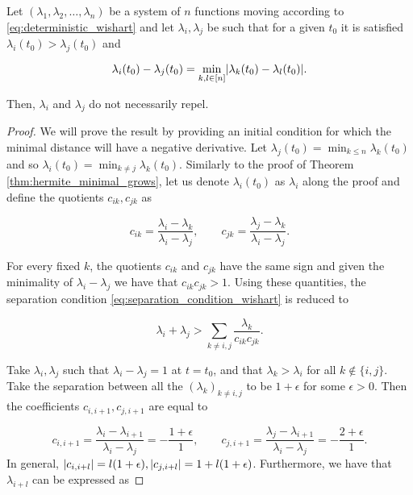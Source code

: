\begin{proposition} \label{proposition:laguerre_does_not_grow}
    Let $(\lambda_1, \lambda_2, \dots, \lambda_n)$ be a system of $n$ functions moving according to \eqref{eq:deterministic_wishart} and let $\lambda_i,\lambda_j$ be such that for a given $t_0$ it is satisfied $\lambda_i(t_0) > \lambda_j(t_0)$ and 
    
    \begin{equation*}
        \lambda_i(t_0) - \lambda_j(t_0) = \min_{k,l \in [n]} \lvert  \lambda_k(t_0) - \lambda_l(t_0) \rvert.
    \end{equation*}

    Then, $\lambda_i$ and $\lambda_j$ do not necessarily repel. 
\end{proposition}

\begin{proof}
    We will prove the result by providing an initial condition for which the minimal distance will have a negative derivative. Let $\lambda_j(t_0) = \min_{k \le n} \lambda_k(t_0)$ and so $\lambda_i(t_0) = \min_{k\neq j} \lambda_k(t_0)$. Similarly to the proof of Theorem \ref{thm:hermite_minimal_grows}, let us denote $\lambda_i(t_0)$ as $\lambda_i$ along the proof and define the quotients $c_{ik},c_{jk}$ as 

    \begin{equation*}
        c_{ik} = \frac{\lambda_i - \lambda_k}{\lambda_i - \lambda_j}, \qquad c_{jk} = \frac{\lambda_j - \lambda_k}{\lambda_i - \lambda_j}.
    \end{equation*}

    For every fixed $k$, the quotients $c_{ik}$ and $c_{jk}$ have the same sign and given the minimality of $\lambda_i - \lambda_j$ we have that $c_{ik}c_{jk}>1$. Using these quantities, the separation condition \eqref{eq:separation_condition_wishart} is reduced to 

    \begin{equation*}
        \lambda_i + \lambda_j > \sum_{k \neq i,j} \frac{\lambda_k}{c_{ik}c_{jk}}.
    \end{equation*}

    Take $\lambda_i, \lambda_j$ such that $\lambda_i - \lambda_j =1$ at $t=t_0$, and that $\lambda_k > \lambda_i$ for all $k \notin \{i,j\}$. Take the separation between all the $(\lambda_k)_{k\neq i,j}$ to be $1+\epsilon$ for some $\epsilon >0$. Then the coefficients $c_{i,i+1}, c_{j,i+1}$ are equal to

    \[ c_{i,i+1} = \frac{\lambda_i - \lambda_{i+1}}{\lambda_i - \lambda_j} = -\frac{1+\epsilon}{1}, \qquad c_{j,i+1} = \frac{\lambda_j - \lambda_{i+1}}{\lambda_i - \lambda_j} = -\frac{2+\epsilon}{1}. \]
    In general, $\lvert c_{i,i+l} \rvert=l(1+\epsilon), \lvert c_{j,i+l} \rvert = 1 + l(1+\epsilon)$. Furthermore, we have that $\lambda_{i+l}$ can be expressed as


\end{proof}
